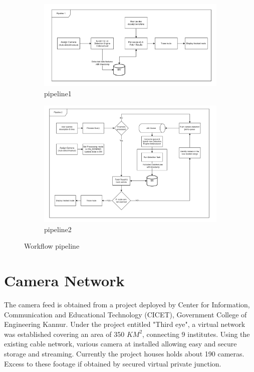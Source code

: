 \begin{figure}
	\centering
	\begin{subfigure}[b]{0.8\linewidth}
		\centering
		\includegraphics[width=\linewidth]{Images/pipeline1}
		\caption{pipeline1}
		\label{fig:pipeline1}
	\end{subfigure}

	\begin{subfigure}[b]{0.8\linewidth}
		\centering
		\includegraphics[width=\linewidth]{Images/pipeline2}
		\caption{pipeline2}
		\label{fig:pipeline2}
	\end{subfigure}
	\caption{Workflow pipeline}
\end{figure}

 


\section{Camera Network}
The camera feed is obtained from a project deployed by Center for Information, Communication and Educational Technology (CICET), Government College of Engineering Kannur. Under the project entitled "Third eye", a virtual network was established covering an area of 350 $KM^2$, connecting 9 institutes. Using the existing cable network, various camera at installed allowing easy and secure storage and streaming. Currently the project houses holds about 190 cameras. Excess to these footage if obtained by secured virtual private junction.

